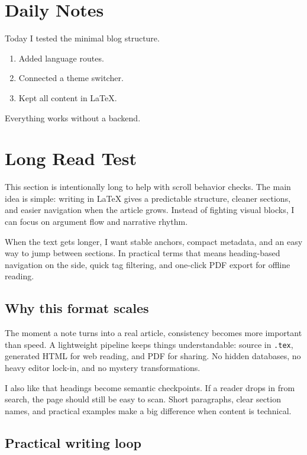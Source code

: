 \section{Daily Notes}

Today I tested the minimal blog structure.

\begin{enumerate}
\item Added language routes.
\item Connected a theme switcher.
\item Kept all content in LaTeX.
\end{enumerate}

Everything works without a backend.

\section{Long Read Test}

This section is intentionally long to help with scroll behavior checks. The main idea is simple: writing in LaTeX gives a predictable structure, cleaner sections, and easier navigation when the article grows. Instead of fighting visual blocks, I can focus on argument flow and narrative rhythm.

When the text gets longer, I want stable anchors, compact metadata, and an easy way to jump between sections. In practical terms that means heading-based navigation on the side, quick tag filtering, and one-click PDF export for offline reading.

\subsection{Why this format scales}

The moment a note turns into a real article, consistency becomes more important than speed. A lightweight pipeline keeps things understandable: source in \texttt{.tex}, generated HTML for web reading, and PDF for sharing. No hidden databases, no heavy editor lock-in, and no mystery transformations.

I also like that headings become semantic checkpoints. If a reader drops in from search, the page should still be easy to scan. Short paragraphs, clear section names, and practical examples make a big difference when content is technical.

\subsection{Practical writing loop}

